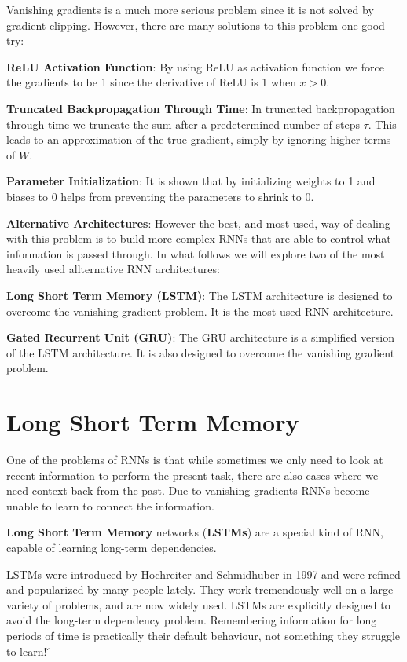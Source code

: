 Vanishing gradients is a much more serious problem since it is not solved by gradient clipping. However, there are
many solutions to this problem one good try:
\bit
\item \textbf{ReLU Activation Function}: By using ReLU as activation function we force the gradients to be 1 since the
derivative of ReLU is 1 when $x>0$.
\item \textbf{Truncated Backpropagation Through Time}: In truncated backpropagation through time we truncate the sum
after a predetermined number of steps $\tau$. This leads to an approximation of the true gradient, simply by ignoring
higher terms of $W$.
\item \textbf{Parameter Initialization}: It is shown that by initializing weights to 1 and biases to 0 helps from
preventing the parameters to shrink to 0.
\item \textbf{Alternative Architectures}: However the best, and most used, way of dealing with this problem is to
build more complex RNNs that are able to control what information is passed through. In what follows we will explore two
of the most heavily used allternative RNN architectures:
\bit
\item \textbf{Long Short Term Memory (LSTM)}: The LSTM architecture is designed to overcome the vanishing gradient
problem. It is the most used RNN architecture.
\item \textbf{Gated Recurrent Unit (GRU)}: The GRU architecture is a simplified version of the LSTM architecture.
It is also designed to overcome the vanishing gradient problem.
\eit
\eit

\section{Long Short Term Memory}

One of the problems of RNNs is that while sometimes we only need to look at recent information to perform the present
task, there are also cases where we need context back from the past. Due to vanishing gradients RNNs become unable to
learn to connect the information.

\textbf{Long Short Term Memory} networks (\textbf{LSTMs}) are a special kind of RNN, capable of learning long-term
dependencies.
\ed

LSTMs were introduced by Hochreiter and Schmidhuber in 1997 and were refined and popularized by many people lately.
They work tremendously well on a large variety of problems, and are now widely used. LSTMs are explicitly designed to
avoid the long-term dependency problem. Remembering information for long periods of time is practically their default
behaviour, not something they struggle to learn! \v

